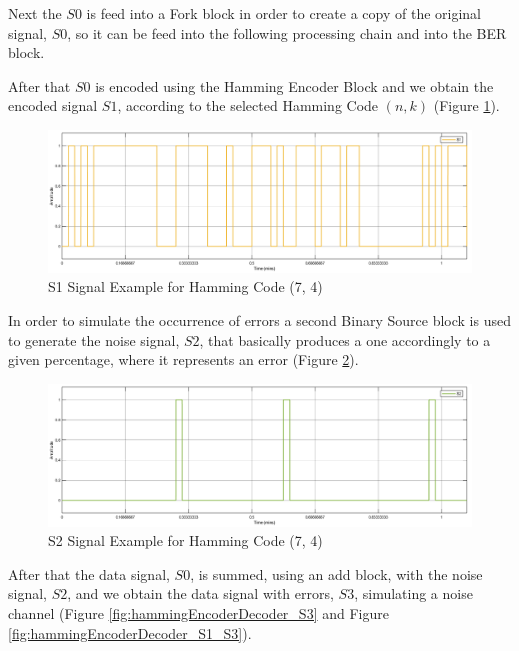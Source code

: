 \begin{refsection}
Next the $S0$ is feed into a Fork block in order to create a copy of the original signal, $S0$, so it can be feed into the following processing chain and into the BER block.

After that $S0$ is encoded using the Hamming Encoder Block and we obtain the encoded signal $S1$, according to the selected Hamming Code $(n, k)$ (Figure \ref{fig:hammingEncoderDecoder_S1}).

\begin{figure}[h!]
	\centering
	\includegraphics[width=.9\linewidth]{./sdf/eit_25828_hamming_channel_encoder_decoder/images/S1.png}
	\vspace{-3mm}
	\caption{S1 Signal Example for Hamming Code (7, 4)}
	\label{fig:hammingEncoderDecoder_S1}
\end{figure}

In order to simulate the occurrence of errors a second Binary Source block is used to generate the noise signal, $S2$, that basically produces a one accordingly to a given percentage, where it represents an error (Figure \ref{fig:hammingEncoderDecoder_S2}).

\begin{figure}[h!]
	\centering
	\includegraphics[width=.9\linewidth]{./sdf/eit_25828_hamming_channel_encoder_decoder/images/S2.png}
	\vspace{-3mm}
	\caption{S2 Signal Example for Hamming Code (7, 4)}
	\label{fig:hammingEncoderDecoder_S2}
\end{figure}

\vspace{60mm}

After that the data signal, $S0$, is summed, using an add block, with the noise signal, $S2$, and we obtain the data signal with errors, $S3$, simulating a noise channel (Figure \ref{fig:hammingEncoderDecoder_S3} and Figure \ref{fig:hammingEncoderDecoder_S1_S3}).


\end{refsection}
